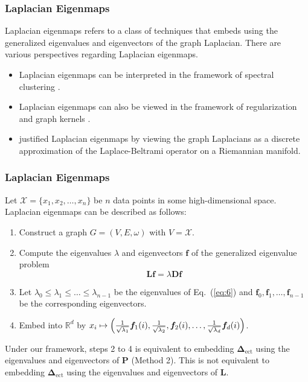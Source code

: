\documentclass[professionalfonts, hyperref={pdfpagelabels=false,
  colorlinks=true, linkcolor=purple}]{beamer}
\begin{document}
\begin{frame}
  \frametitle{Laplacian Eigenmaps}
  Laplacian eigenmaps refers to a class of techniques
  that embeds using the \alert{generalized} eigenvalues and eigenvectors of
  the graph Laplacian. There are various perspectives regarding
  Laplacian eigenmaps. 
  \vskip10pt
  \begin{itemize}
  \item Laplacian eigenmaps can be interpreted in the framework of
    spectral clustering \cite{shi97:_normal}. \vskip5pt
  \item  Laplacian eigenmaps can also be viewed in the framework of
    regularization and graph kernels \cite{smola03:_kernel}. \vskip5pt
  \item \cite{belkin03:_laplac} justified Laplacian
    eigenmaps by viewing the graph Laplacians as a discrete
    approximation of the Laplace-Beltrami operator on a Riemannian
    manifold.  
  \end{itemize}
\end{frame}


\begin{frame}
  \frametitle{Laplacian Eigenmaps}
  Let $\mathcal{X} = \{x_1,x_2,\dots,x_n\}$ be $n$ data points in some
  high-dimensional space. Laplacian eigenmaps can be described as
  follows:
  \vskip10pt
  \begin{enumerate}
  \item Construct a graph $G = (V,E,\omega)$ with $V = \mathcal{X}$.
  \item Compute the eigenvalues $\lambda$ and eigenvectors
    $\bm{f}$ of the generalized eigenvalue problem
    \begin{equation}
      \label{eq:6}
      \bm{Lf} = \lambda \bm{Df}
    \end{equation}
  \item Let $\lambda_0 \leq \lambda_1 \leq \dots \leq \lambda_{n-1}$ be
    the eigenvalues of Eq.~(\ref{eq:6}) and $\bm{f}_0, \bm{f}_1,
    \dots, \bm{f}_{n-1}$ be the corresponding eigenvectors. 
  \item Embed into $\mathbb{R}^{d}$ by
      $x_i \mapsto \Bigl(\tfrac{1}{\sqrt{\lambda_1}} \bm{f}_{1}(i),
      \tfrac{1}{\sqrt{\lambda_2}},
      \bm{f}_{2}(i), \dots, \tfrac{1}{\sqrt{\lambda_d}}
      \bm{f}_{d}(i)\Bigr)$.
  \end{enumerate}
  \vskip10pt
  \begin{alertblock}{}
    Under our framework, steps 2 to 4 is equivalent to embedding
    $\bm{\Delta}_{\mathrm{ect}}$ using the eigenvalues and
    eigenvectors of $\mathbf{P}$ (Method 2). This is \alert{not} equivalent to
    embedding $\bm{\Delta}_{\mathrm{ect}}$ using the eigenvalues and
    eigenvectors of $\mathbf{L}$. 
  \end{alertblock}
\end{frame}
\end{document}
